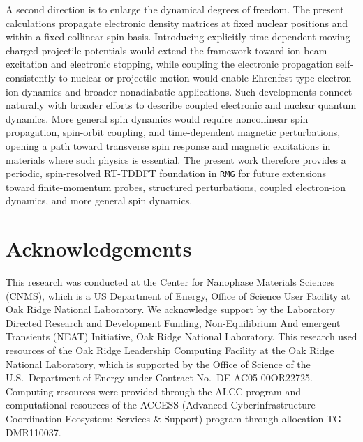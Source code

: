 \documentclass[journal=jctcce,manuscript=article,etalmode=truncate,maxauthors=10,layout=onecolumn]{achemso}
\begin{document}
A second direction is to enlarge the dynamical degrees of freedom.  The
present calculations propagate electronic density matrices at fixed
nuclear positions and within a fixed collinear spin basis.  Introducing
explicitly time-dependent moving charged-projectile potentials would
extend the framework toward ion-beam excitation and electronic
stopping,\cite{theo-comp-chem-DBL-2022} while coupling the electronic
propagation self-consistently to nuclear or projectile motion would
enable Ehrenfest-type electron-ion dynamics and broader nonadiabatic
applications.  Such developments connect naturally with broader efforts
to describe coupled electronic and nuclear quantum
dynamics.\cite{Garashchuk-Jakowski-Rassolov-2026}  More general spin
dynamics would require noncollinear spin propagation, spin-orbit
coupling, and time-dependent magnetic perturbations, opening a path
toward transverse spin response and magnetic excitations in materials
where such physics is essential.  The present work therefore provides a
periodic, spin-resolved RT-TDDFT foundation in \texttt{RMG} for future
extensions toward finite-momentum probes, structured perturbations,
coupled electron-ion dynamics, and more general spin dynamics.


\section{Acknowledgements}
\label{sec:acknowledgements}

This research was conducted at the Center for Nanophase Materials
Sciences (CNMS), which is a US Department of Energy, Office of Science
User Facility at Oak Ridge National Laboratory.
We acknowledge support by the Laboratory Directed Research and Development Funding,
Non-Equilibrium And emergent Transients (NEAT) Initiative, Oak Ridge National Laboratory.
This research used resources of the Oak Ridge Leadership Computing
Facility at the Oak Ridge National Laboratory, which is supported by
the Office of Science of the U.S.\ Department of Energy under
Contract No.\ DE-AC05-00OR22725.
Computing resources were provided through the ALCC program
and computational resources of the ACCESS (Advanced Cyberinfrastructure
Coordination Ecosystem: Services \& Support) program through allocation
TG-DMR110037.



\appendix

\end{document}
